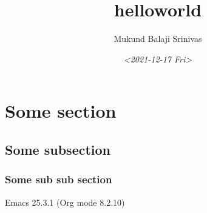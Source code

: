 \documentclass[11pt]{article}
\author{Mukund Balaji Srinivas}
\date{\textit{<2021-12-17 Fri>}}
\title{helloworld}
\begin{document}
\maketitle
\section{Some section}
\label{sec:org83d1371}
\subsection{Some subsection}
\label{sec:orgd45e430}
\subsubsection{Some sub sub section}
\label{sec:org4fd34f2}
Emacs 25.3.1 (Org mode 8.2.10)
\end{document}
